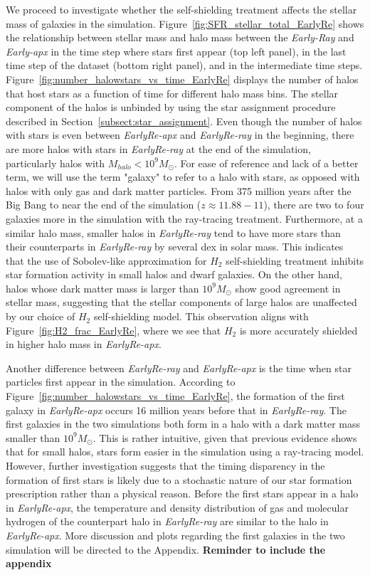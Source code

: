 \documentclass[linenumbers, twocolumn]{aastex631}
\begin{document}
We proceed to investigate whether the self-shielding treatment affects the stellar mass of galaxies in the simulation. Figure~\ref{fig:SFR_stellar_total_EarlyRe} shows the relationship between stellar mass and halo mass between the \textit{Early-Ray} and \textit{Early-apx} in the time step where stars first appear (top left panel), in the last time step of the dataset (bottom right panel), and in the intermediate time steps. Figure~\ref{fig:number_halowstars_vs_time_EarlyRe} displays the number of halos that host stars as a function of time for different halo mass bins. The stellar component of the halos is unbinded by using the star assignment procedure described in Section~\ref{subsect:star_assignment}. Even though the number of halos with stars is even between \textit{EarlyRe-apx} and \textit{EarlyRe-ray} in the beginning, there are more halos with stars in \textit{EarlyRe-ray} at the end of the simulation, particularly halos with $M_{halo} < 10^{9} M_\odot$. For ease of reference and lack of a better term, we will use the term "galaxy" to refer to a halo with stars, as opposed with halos with only gas and dark matter particles. From 375 million years after the Big Bang to near the end of the simulation ($z \approx 11.88 - 11$), there are two to four galaxies more in the simulation with the ray-tracing treatment. Furthermore, at a similar halo mass, smaller halos in \textit{EarlyRe-ray} tend to have more stars than their counterparts in \textit{EarlyRe-ray} by several dex in solar mass. This indicates that the use of Sobolev-like approximation for $H_{2}$ self-shielding treatment inhibits star formation activity in small halos and dwarf galaxies. On the other hand, halos whose dark matter mass is larger than $10^{9} M_\odot$ show good agreement in stellar mass, suggesting that the stellar components of large halos are unaffected by our choice of $H_{2}$ self-shielding model. This observation aligns with Figure~\ref{fig:H2_frac_EarlyRe}, where we see that $H_{2}$ is more accurately shielded in higher halo mass in \textit{EarlyRe-apx}.

Another difference between \textit{EarlyRe-ray} and \textit{EarlyRe-apx} is the time when star particles first appear in the simulation. According to Figure~\ref{fig:number_halowstars_vs_time_EarlyRe}, the formation of the first galaxy in \textit{EarlyRe-apx} occurs 16 million years before that in \textit{EarlyRe-ray}. The first galaxies in the two simulations both form in a halo with a dark matter mass smaller than $10^{9} M_\odot$. This is rather intuitive, given that previous evidence shows that for small halos, stars form easier in the simulation using a ray-tracing model. However, further investigation suggests that the timing disparency in the formation of first stars is likely due to a stochastic nature of our star formation prescription rather than a physical reason. Before the first stars appear in a halo in \textit{EarlyRe-apx}, the temperature and density distribution of gas and molecular hydrogen of the counterpart halo in \textit{EarlyRe-ray} are similar to the halo in \textit{EarlyRe-apx}. More discussion and plots regarding the first galaxies in the two simulation will be directed to the Appendix. \textbf{Reminder to include the appendix}
\end{document}
